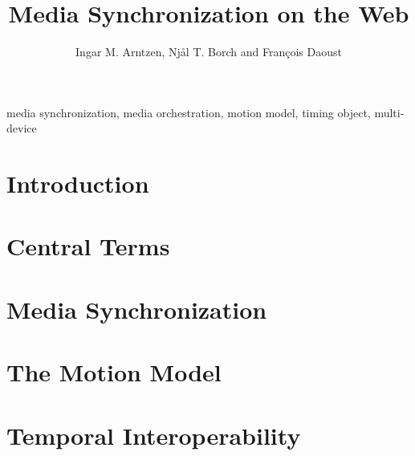\documentclass[graybox]{svmult}
\begin{document}
\title*{Media Synchronization on the Web}
\author{Ingar M. Arntzen, Nj{\aa}l T. Borch and Fran\c{c}ois Daoust}

\maketitle

\abstract{

}

\begin{keywords}
media synchronization, media orchestration, motion model, timing object, multi-device
\end{keywords}

\section{Introduction}
\label{sec:intro}


\section{Central Terms}
\label{sec:terms}


\section{Media Synchronization}
\label{sec:mediasync}


\section{The Motion Model}
\label{sec:model}


\section{Temporal Interoperability}
\label{sec:interoperability}

\end{document}
